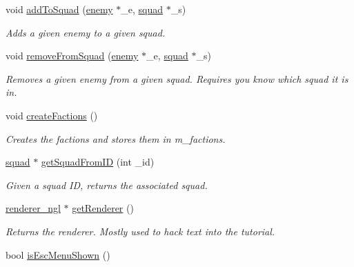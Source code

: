 \begin{DoxyCompactItemize}
\item 
void \hyperlink{classuniverse_a5125ff87385bdd80c1e96f302e0594f6}{add\-To\-Squad} (\hyperlink{classenemy}{enemy} $\ast$\-\_\-e, \hyperlink{structsquad}{squad} $\ast$\-\_\-s)
\begin{DoxyCompactList}\small\item\em Adds a given enemy to a given squad. \end{DoxyCompactList}\item 
void \hyperlink{classuniverse_a3af60fa4c1b4e0c691c940f0d9e2af88}{remove\-From\-Squad} (\hyperlink{classenemy}{enemy} $\ast$\-\_\-e, \hyperlink{structsquad}{squad} $\ast$\-\_\-s)
\begin{DoxyCompactList}\small\item\em Removes a given enemy from a given squad. Requires you know which squad it is in. \end{DoxyCompactList}\item 
\hypertarget{classuniverse_ac067d5e3b2a77871d317538d86638078}{void \hyperlink{classuniverse_ac067d5e3b2a77871d317538d86638078}{create\-Factions} ()}\label{classuniverse_ac067d5e3b2a77871d317538d86638078}

\begin{DoxyCompactList}\small\item\em Creates the factions and stores them in m\-\_\-factions. \end{DoxyCompactList}\item 
\hypertarget{classuniverse_a1069edc3188cbb18edc64d73c3f9cce0}{\hyperlink{structsquad}{squad} $\ast$ \hyperlink{classuniverse_a1069edc3188cbb18edc64d73c3f9cce0}{get\-Squad\-From\-I\-D} (int \-\_\-id)}\label{classuniverse_a1069edc3188cbb18edc64d73c3f9cce0}

\begin{DoxyCompactList}\small\item\em Given a squad I\-D, returns the associated squad. \end{DoxyCompactList}\item 
\hypertarget{classuniverse_a510e65884b42bae6d4e5469a476bd9e0}{\hyperlink{classrenderer__ngl}{renderer\-\_\-ngl} $\ast$ \hyperlink{classuniverse_a510e65884b42bae6d4e5469a476bd9e0}{get\-Renderer} ()}\label{classuniverse_a510e65884b42bae6d4e5469a476bd9e0}

\begin{DoxyCompactList}\small\item\em Returns the renderer. Mostly used to hack text into the tutorial. \end{DoxyCompactList}\item 
\hypertarget{classuniverse_a14b80a5ddef84ee3dff40cd2d4a394b3}{bool \hyperlink{classuniverse_a14b80a5ddef84ee3dff40cd2d4a394b3}{is\-Esc\-Menu\-Shown} ()}\label{classuniverse_a14b80a5ddef84ee3dff40cd2d4a394b3}


\end{DoxyCompactItemize}
